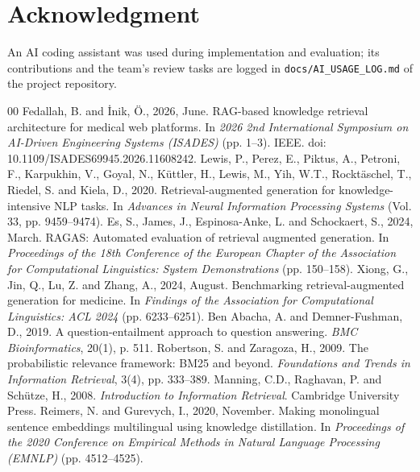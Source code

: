 \documentclass[conference]{IEEEtran}
\begin{document}
\section*{Acknowledgment}
An AI coding assistant was used during implementation and evaluation; its contributions and the team's review tasks are logged in \texttt{docs/AI\_USAGE\_LOG.md} of the project repository.

\begin{thebibliography}{00}
 Fedallah, B. and \.{I}nik, \"{O}., 2026, June. RAG-based knowledge retrieval architecture for medical web platforms. In \textit{2026 2nd International Symposium on AI-Driven Engineering Systems (ISADES)} (pp. 1--3). IEEE. doi: 10.1109/ISADES69945.2026.11608242.
 Lewis, P., Perez, E., Piktus, A., Petroni, F., Karpukhin, V., Goyal, N., K\"{u}ttler, H., Lewis, M., Yih, W.T., Rockt\"{a}schel, T., Riedel, S. and Kiela, D., 2020. Retrieval-augmented generation for knowledge-intensive NLP tasks. In \textit{Advances in Neural Information Processing Systems} (Vol. 33, pp. 9459--9474).
 Es, S., James, J., Espinosa-Anke, L. and Schockaert, S., 2024, March. RAGAS: Automated evaluation of retrieval augmented generation. In \textit{Proceedings of the 18th Conference of the European Chapter of the Association for Computational Linguistics: System Demonstrations} (pp. 150--158).
 Xiong, G., Jin, Q., Lu, Z. and Zhang, A., 2024, August. Benchmarking retrieval-augmented generation for medicine. In \textit{Findings of the Association for Computational Linguistics: ACL 2024} (pp. 6233--6251).
 Ben Abacha, A. and Demner-Fushman, D., 2019. A question-entailment approach to question answering. \textit{BMC Bioinformatics}, 20(1), p. 511.
 Robertson, S. and Zaragoza, H., 2009. The probabilistic relevance framework: BM25 and beyond. \textit{Foundations and Trends in Information Retrieval}, 3(4), pp. 333--389.
 Manning, C.D., Raghavan, P. and Sch\"{u}tze, H., 2008. \textit{Introduction to Information Retrieval}. Cambridge University Press.
 Reimers, N. and Gurevych, I., 2020, November. Making monolingual sentence embeddings multilingual using knowledge distillation. In \textit{Proceedings of the 2020 Conference on Empirical Methods in Natural Language Processing (EMNLP)} (pp. 4512--4525).

\end{thebibliography}
\end{document}
